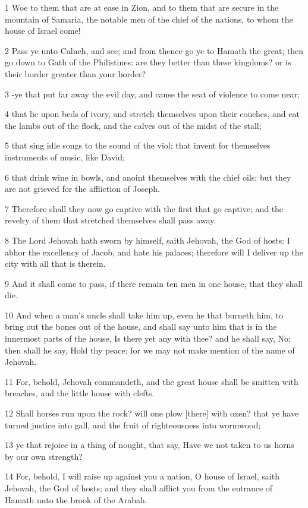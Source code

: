 \par 1 Woe to them that are at ease in Zion, and to them that are secure in the mountain of Samaria, the notable men of the chief of the nations, to whom the house of Israel come!
\par 2 Pass ye unto Calneh, and see; and from thence go ye to Hamath the great; then go down to Gath of the Philistines: are they better than these kingdoms? or is their border greater than your border?
\par 3 -ye that put far away the evil day, and cause the seat of violence to come near;
\par 4 that lie upon beds of ivory, and stretch themselves upon their couches, and eat the lambs out of the flock, and the calves out of the midst of the stall;
\par 5 that sing idle songs to the sound of the viol; that invent for themselves instruments of music, like David;
\par 6 that drink wine in bowls, and anoint themselves with the chief oils; but they are not grieved for the affliction of Joseph.
\par 7 Therefore shall they now go captive with the first that go captive; and the revelry of them that stretched themselves shall pass away.
\par 8 The Lord Jehovah hath sworn by himself, saith Jehovah, the God of hosts: I abhor the excellency of Jacob, and hate his palaces; therefore will I deliver up the city with all that is therein.
\par 9 And it shall come to pass, if there remain ten men in one house, that they shall die.
\par 10 And when a man's uncle shall take him up, even he that burneth him, to bring out the bones out of the house, and shall say unto him that is in the innermost parts of the house, Is there yet any with thee? and he shall say, No; then shall he say, Hold thy peace; for we may not make mention of the name of Jehovah.
\par 11 For, behold, Jehovah commandeth, and the great house shall be smitten with breaches, and the little house with clefts.
\par 12 Shall horses run upon the rock? will one plow [there] with oxen? that ye have turned justice into gall, and the fruit of righteousness into wormwood;
\par 13 ye that rejoice in a thing of nought, that say, Have we not taken to us horns by our own strength?
\par 14 For, behold, I will raise up against you a nation, O house of Israel, saith Jehovah, the God of hosts; and they shall afflict you from the entrance of Hamath unto the brook of the Arabah.

